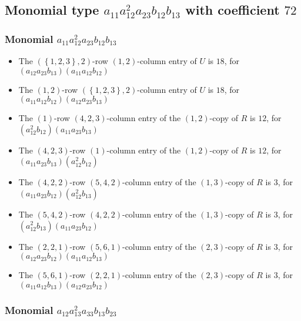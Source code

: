 \documentclass{article}
\begin{document}
\subsection{Monomial type $ a_{11} a_{12}^{2} a_{23} b_{12} b_{13} $ with coefficient $ 72 $}

\subsubsection{Monomial $ a_{11} a_{12}^{2} a_{23} b_{12} b_{13} $}

\begin{itemize}
\item The $ \left(\left\{1, 2, 3\right\}, 2\right) $-row $ \left(1, 2\right) $-column entry of $U$ is $ 18 $, for $( a_{12} a_{23} b_{13} )( a_{11} a_{12} b_{12} )$ 
\item The $ \left(1, 2\right) $-row $ \left(\left\{1, 2, 3\right\}, 2\right) $-column entry of $U$ is $ 18 $, for $( a_{11} a_{12} b_{12} )( a_{12} a_{23} b_{13} )$ 
\item The $(1)$-row $(4, 2, 3)$-column entry of the $ \left(1, 2\right) $-copy of $R$ is $ 12 $, for $( a_{12}^{2} b_{12} )( a_{11} a_{23} b_{13} )$ 
\item The $(4, 2, 3)$-row $(1)$-column entry of the $ \left(1, 2\right) $-copy of $R$ is $ 12 $, for $( a_{11} a_{23} b_{13} )( a_{12}^{2} b_{12} )$ 
\item The $(4, 2, 2)$-row $(5, 4, 2)$-column entry of the $ \left(1, 3\right) $-copy of $R$ is $ 3 $, for $( a_{11} a_{23} b_{12} )( a_{12}^{2} b_{13} )$ 
\item The $(5, 4, 2)$-row $(4, 2, 2)$-column entry of the $ \left(1, 3\right) $-copy of $R$ is $ 3 $, for $( a_{12}^{2} b_{13} )( a_{11} a_{23} b_{12} )$ 
\item The $(2, 2, 1)$-row $(5, 6, 1)$-column entry of the $ \left(2, 3\right) $-copy of $R$ is $ 3 $, for $( a_{12} a_{23} b_{12} )( a_{11} a_{12} b_{13} )$ 
\item The $(5, 6, 1)$-row $(2, 2, 1)$-column entry of the $ \left(2, 3\right) $-copy of $R$ is $ 3 $, for $( a_{11} a_{12} b_{13} )( a_{12} a_{23} b_{12} )$ 
\end{itemize}
\subsubsection{Monomial $ a_{12} a_{13}^{2} a_{33} b_{13} b_{23} $}
\end{document}
